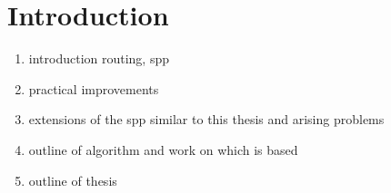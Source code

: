 
\chapter{Introduction}
\label{ch:introduction}

\begin{enumerate}
	\item introduction routing, spp
	\item practical improvements
	\item extensions of the spp similar to this thesis and arising problems
	\item outline of algorithm and work on which is based
	\item outline of thesis
\end{enumerate}